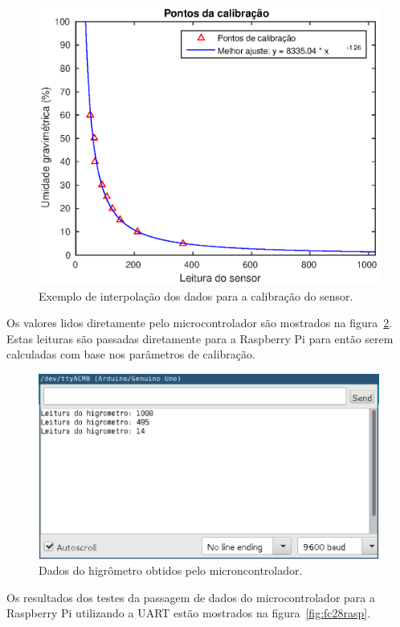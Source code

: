 			\begin{figure}[!htbp]
			\begin{center}
			\includegraphics[width=.7\textwidth]{figuras/calibration.eps}
			\caption{\label{fig:calibration}Exemplo de interpolação dos dados para a calibração do sensor.}
			\end{center}
			\end{figure}

			Os valores lidos diretamente pelo microcontrolador são mostrados na figura~\ref{fig:fc28ardu}.
			Estas leituras são passadas diretamente para a Raspberry Pi para então serem
			calculadas com base nos parâmetros de calibração.

			\begin{figure}[!htbp]
			\begin{center}
			\includegraphics[width=.8\textwidth]{figuras/fc28_arduino.eps}
			\caption{\label{fig:fc28ardu}Dados do higrômetro obtidos pelo microncontrolador.}
			\end{center}
			\end{figure}

			Os resultados dos testes da passagem de dados do microcontrolador para a Raspberry Pi utilizando a UART
			estão mostrados na figura~\ref{fig:fc28rasp}.

